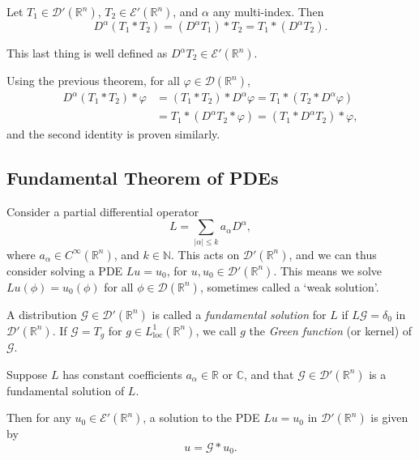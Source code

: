 \documentclass[12pt]{article}
\begin{document}
\begin{theorem}
	Let $T_1 \in \mathcal{D}'(\mathbb{R}^n)$, $T_2 \in \mathcal{E}'(\mathbb{R}^n)$, and $\alpha$ any multi-index. Then
	\[
	D^\alpha (T_1 \ast T_2) = (D^\alpha T_1) \ast T_2 = T_1 \ast (D^\alpha T_2).
	\]
\end{theorem}

This last thing is well defined as $D^\alpha T_2 \in \mathcal{E}'(\mathbb{R}^n)$.

\begin{proofbox}
	Using the previous theorem, for all $\varphi \in \mathcal{D}(\mathbb{R}^n)$,
	\begin{align*}
		D^\alpha (T_1 \ast T_2) \ast \varphi &= (T_1 \ast T_2) \ast D^\alpha \varphi = T_1 \ast (T_2 \ast D^\alpha \varphi) \\
						     &= T_1 \ast (D^\alpha T_2 \ast \varphi) = (T_1 \ast D^\alpha T_2) \ast \varphi,
	\end{align*}
	and the second identity is proven similarly.
\end{proofbox}

\subsection{Fundamental Theorem of PDEs}
\label{sub:ftopde}

Consider a partial differential operator
\[
L = \sum_{|\alpha| \leq k} a_\alpha D^\alpha,
\]
where $a_\alpha \in C^\infty (\mathbb{R}^n)$, and $k \in \mathbb{N}$. This acts on $\mathcal{D}'(\mathbb{R}^n)$, and we can thus consider solving a PDE $Lu = u_0$, for $u, u_0 \in \mathcal{D}'(\mathbb{R}^n)$. This means we solve $Lu(\phi) = u_0(\phi)$ for all $\phi \in \mathcal{D}(\mathbb{R}^n)$, sometimes called a `weak solution'.

A distribution $\mathcal{G} \in \mathcal{D}'(\mathbb{R}^n)$ is called a \emph{fundamental solution} for $L$ if $L \mathcal{G} = \delta_0$ in $\mathcal{D}'(\mathbb{R}^n)$. If $\mathcal{G} = T_g$ for $g \in L^1_{\mathrm{loc}}(\mathbb{R}^n)$, we call $g$ the \emph{Green function} (or kernel) of $\mathcal{G}$.

\begin{theorem}
	Suppose $L$ has constant coefficients $a_\alpha \in \mathbb{R}$ or $\mathbb{C}$, and that $\mathcal{G} \in \mathcal{D}'(\mathbb{R}^n)$ is a fundamental solution of $L$.

	Then for any $u_0 \in \mathcal{E}'(\mathbb{R}^n)$, a solution to the PDE $Lu = u_0$ in $\mathcal{D}'(\mathbb{R}^n)$ is given by
	\[
	u = \mathcal{G} \ast u_0.
	\]
\end{theorem}
 
\end{document}
